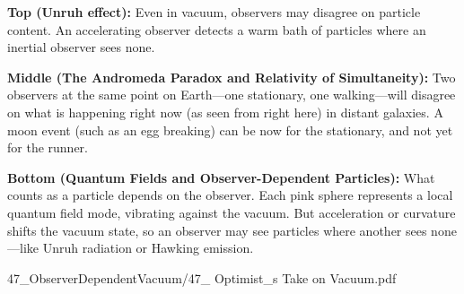 \begin{SideNotePage}{
  \textbf{Top (Unruh effect):}  
   Even in vacuum, observers may disagree on particle content. An accelerating observer detects a warm bath of particles where an inertial observer sees none.\par

  \textbf{Middle (The Andromeda Paradox and Relativity of Simultaneity):}  
  Two observers at the same point on Earth—one stationary, one walking—will disagree on what is happening right now (as seen from right here) in distant galaxies. A moon event (such as an egg breaking) can be \QSOpen{}now\QSClose{} for the stationary, and \QSOpen{}not yet\QSClose{} for the runner.\par

  \textbf{Bottom (Quantum Fields and Observer-Dependent Particles):}  
  What counts as a particle depends on the observer. Each pink sphere represents a local quantum field mode, vibrating against the vacuum. But acceleration or curvature shifts the vacuum state, so an observer may see particles where another sees none—like Unruh radiation or Hawking emission. \par

}{47_ObserverDependentVacuum/47_ Optimist_s Take on Vacuum.pdf}
\end{SideNotePage}
